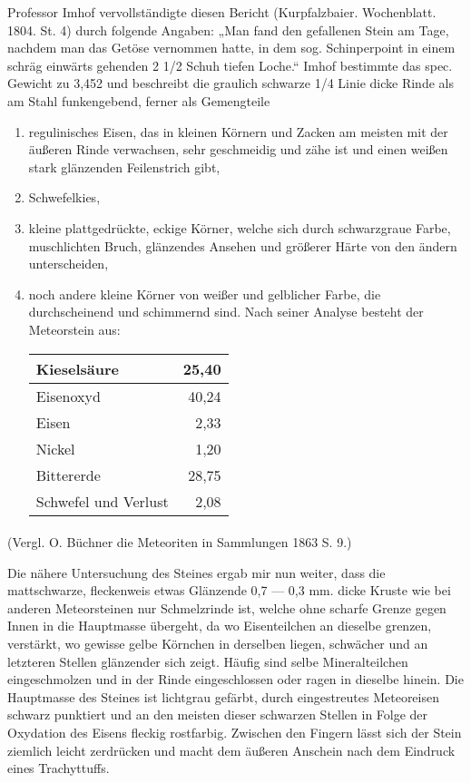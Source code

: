 \documentclass[a4paper, 11pt, oneside]{article}
\begin{document}
Professor Imhof vervollständigte diesen Bericht (Kurpfalzbaier. Wochenblatt. 1804. St. 4) durch folgende Angaben: „Man fand den gefallenen Stein am Tage, nachdem man das Getöse vernommen hatte, in dem sog. Schinperpoint in einem schräg einwärts gehenden 2 1/2 Schuh tiefen Loche.“ Imhof bestimmte das spec. Gewicht zu 3,452 und beschreibt die graulich schwarze 1/4 Linie dicke Rinde als am Stahl funkengebend, ferner als Gemengteile
\begin{enumerate}
    \item regulinisches Eisen, das in kleinen Körnern und Zacken am meisten mit der äußeren Rinde verwachsen, sehr geschmeidig und zähe ist und einen weißen stark glänzenden Feilenstrich gibt,
    \item Schwefelkies,
    \item kleine plattgedrückte, eckige Körner, welche sich durch schwarzgraue Farbe, muschlichten Bruch, glänzendes Ansehen und größerer Härte von den ändern unterscheiden,
    \item noch andere kleine Körner von weißer und gelblicher Farbe, die durchscheinend und schimmernd sind. Nach seiner Analyse besteht der Meteorstein aus:
    \begin{center}
        \begin{tabular}{ |l|r| } 
        \hline
        Kieselsäure & 25,40\\\hline
        Eisenoxyd & 40,24\\\hline
        Eisen & 2,33\\\hline
        Nickel & 1,20\\\hline
        Bittererde & 28,75\\\hline
        Schwefel und Verlust & 2,08\\
        \hline
        \end{tabular}
    \end{center}
\end{enumerate}
\paragraph{}
(Vergl. O. Büchner die Meteoriten in Sammlungen 1863 S. 9.)

Die nähere Untersuchung des Steines ergab mir nun weiter, dass die mattschwarze, fleckenweis etwas Glänzende 0,7 — 0,3 mm. dicke Kruste wie bei anderen Meteorsteinen nur Schmelzrinde ist, welche ohne scharfe Grenze gegen Innen in die Hauptmasse übergeht, da wo Eisenteilchen an dieselbe grenzen, verstärkt, wo gewisse gelbe Körnchen in derselben liegen, schwächer und an letzteren Stellen glänzender sich zeigt. Häufig sind selbe Mineralteilchen eingeschmolzen und in der Rinde eingeschlossen oder ragen in dieselbe hinein. Die Hauptmasse des Steines ist lichtgrau gefärbt, durch eingestreutes Meteoreisen schwarz punktiert und an den meisten dieser schwarzen Stellen in Folge der Oxydation des Eisens fleckig rostfarbig. Zwischen den Fingern lässt sich der Stein ziemlich leicht zerdrücken und macht dem äußeren Anschein nach dem Eindruck eines Trachyttuffs.
\end{document}
